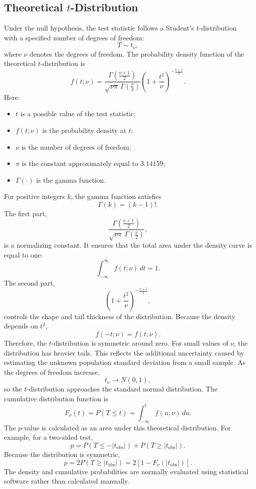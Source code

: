 \documentclass[11pt]{article}
\begin{document}
\subsection{Theoretical \(t\)-Distribution} Under the null hypothesis, the test statistic follows a Student's \(t\)-distribution with a specified number of degrees of freedom: \[ T\sim t_{\nu}, \] where \(\nu\) denotes the degrees of freedom. The probability density function of the theoretical \(t\)-distribution is \[ f(t;\nu) = \frac{ \Gamma\left(\frac{\nu+1}{2}\right) }{ \sqrt{\nu\pi}\, \Gamma\left(\frac{\nu}{2}\right) } \left( 1+\frac{t^2}{\nu} \right)^{-\frac{\nu+1}{2}}. \] Here: \begin{itemize}[noitemsep] \item \(t\) is a possible value of the test statistic; \item \(f(t;\nu)\) is the probability density at \(t\); \item \(\nu\) is the number of degrees of freedom; \item \(\pi\) is the constant approximately equal to \(3.14159\); \item \(\Gamma(\cdot)\) is the gamma function. \end{itemize} For positive integers \(k\), the gamma function satisfies \[ \Gamma(k)=(k-1)!. \] The first part, \[ \frac{ \Gamma\left(\frac{\nu+1}{2}\right) }{ \sqrt{\nu\pi}\, \Gamma\left(\frac{\nu}{2}\right) }, \] is a normalizing constant. It ensures that the total area under the density curve is equal to one: \[ \int_{-\infty}^{\infty} f(t;\nu)\,dt=1. \] The second part, \[ \left( 1+\frac{t^2}{\nu} \right)^{-\frac{\nu+1}{2}}, \] controls the shape and tail thickness of the distribution. Because the density depends on \(t^2\), \[ f(-t;\nu)=f(t;\nu). \] Therefore, the \(t\)-distribution is symmetric around zero. For small values of \(\nu\), the distribution has heavier tails. This reflects the additional uncertainty caused by estimating the unknown population standard deviation from a small sample. As the degrees of freedom increase, \[ t_{\nu}\longrightarrow N(0,1), \] so the \(t\)-distribution approaches the standard normal distribution. The cumulative distribution function is \[ F_{\nu}(t) = P(T\leq t) = \int_{-\infty}^{t}f(u;\nu)\,du. \] The \(p\)-value is calculated as an area under this theoretical distribution. For example, for a two-sided test, \[ p = P(T\leq-|t_{\mathrm{obs}}|) + P(T\geq|t_{\mathrm{obs}}|). \] Because the distribution is symmetric, \[ p = 2P(T\geq|t_{\mathrm{obs}}|) = 2\left[1-F_{\nu}(|t_{\mathrm{obs}}|)\right]. \] The density and cumulative probabilities are normally evaluated using statistical software rather than calculated manually.
\end{document}
